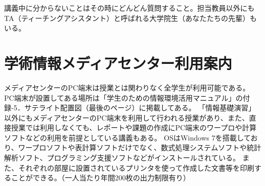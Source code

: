  
講義中に分からないことはその時にどんどん質問すること。担当教員以外にもTA（ティーチングアシスタント）と呼ばれる大学院生（あなたたちの先輩）もいる。
　
\section{学術情報メディアセンター利用案内}
メディアセンターのPC端末は授業とは関わりなく全学生が利用可能である。
PC端末が設置してある場所は「学生のための情報環境活用マニュアル」の付録-5．サテライト配置図（最後のページ）に掲載してある。
「情報基礎演習」以外にもメディアセンターのPC端末を利用して行われる授業があり、また、直接授業では利用しなくても、レポートや課題の作成にPC端末のワープロや計算ソフトなどの利用を前提としている講義もある。
OSはWindows 7を搭載しており、ワープロソフトや表計算ソフトだけでなく、数式処理システムソフトや統計解析ソフト、プログラミング支援ソフトなどがインストールされている。
また、それぞれの部屋に設置されているプリンタを使って作成した文書等を印刷することができる。（一人当たり年間200枚の出力制限有り）
　
